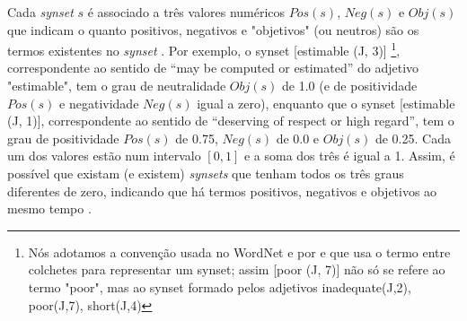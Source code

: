 Cada \textit{synset} $s$ é associado a três valores numéricos $Pos(s)$, $Neg(s)$ e $Obj(s)$ que indicam o quanto positivos, negativos e "objetivos" (ou neutros) são os termos existentes no \textit{synset} \cite{baccianella2010sentiwordnet}.
Por exemplo, o synset [estimable (J, 3)] \footnote{Nós adotamos a convenção usada no WordNet e por \cite{esuli2006sentiwordnet} e \cite{baccianella2010sentiwordnet} que usa o termo entre colchetes para representar um synset; assim [poor (J, 7)] não só se refere ao termo "poor", mas ao synset formado pelos adjetivos {inadequate(J,2), poor(J,7), short(J,4)}}, correspondente ao sentido de “may be computed or estimated” do adjetivo "estimable", tem o grau de neutralidade $Obj(s)$ de 1.0 (e de positividade $Pos(s)$ e negatividade $Neg(s)$ igual a zero), enquanto que o synset [estimable (J, 1)], correspondente ao sentido de “deserving of respect or high regard”, tem o grau de positividade $Pos(s)$ de 0.75, $Neg(s)$ de 0.0 e $Obj(s)$ de 0.25. Cada um dos valores estão num intervalo $[0, 1]$ e a soma dos três é igual a 1. Assim, é possível que existam (e existem) \textit{synsets} que tenham todos os três graus diferentes de zero, indicando que há termos positivos, negativos e objetivos ao mesmo tempo \cite{esuli2006sentiwordnet}.
